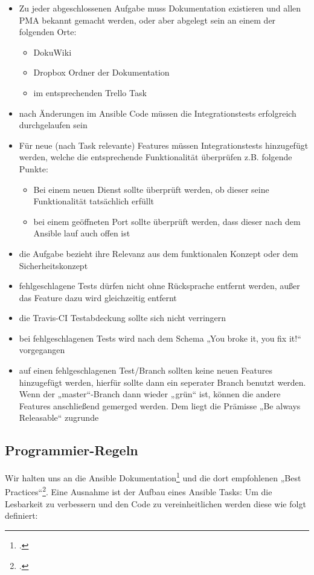 \begin{itemize}
\item Zu jeder abgeschlossenen Aufgabe muss Dokumentation existieren und allen PMA bekannt gemacht werden, oder aber abgelegt sein an einem der folgenden Orte:   
\begin{itemize}
\item DokuWiki
\item Dropbox Ordner der Dokumentation
\item im entsprechenden Trello Task
\end{itemize}
\item nach Änderungen im Ansible Code müssen die Integrationstests erfolgreich durchgelaufen sein
\item Für neue (nach Task relevante) Features müssen Integrationstests hinzugefügt werden, welche die entsprechende Funktionalität überprüfen z.B. folgende Punkte:
\begin{itemize}
\item Bei einem neuen Dienst sollte überprüft werden, ob dieser seine Funktionalität tatsächlich erfüllt
\item bei einem geöffneten Port sollte überprüft werden, dass dieser nach dem Ansible lauf auch offen ist
\end{itemize}
\item die Aufgabe bezieht ihre Relevanz aus dem funktionalen Konzept oder dem Sicherheitskonzept
\item fehlgeschlagene Tests dürfen nicht ohne Rücksprache entfernt werden, außer das Feature dazu wird gleichzeitig entfernt
\item die Travis-CI Testabdeckung sollte sich nicht verringern
\item bei fehlgeschlagenen Tests wird nach dem Schema „You broke it, you fix it!“ vorgegangen
\item auf einen fehlgeschlagenen Test/Branch sollten keine neuen Features hinzugefügt werden, hierfür sollte dann ein seperater Branch benutzt werden. Wenn der „master“-Branch dann wieder „grün“ ist, können die andere Features anschließend gemerged werden. Dem liegt die Prämisse „Be always Releasable“ zugrunde 
\end{itemize}

\subsection{Programmier-Regeln}
Wir halten uns an die Ansible Dokumentation\footcite{ansible} und die dort empfohlenen „Best Practices“\footcite{ansibleBestPractices}. Eine Ausnahme ist der Aufbau eines Ansible Tasks: Um die Lesbarkeit zu verbessern und den Code zu vereinheitlichen werden diese wie folgt definiert:

